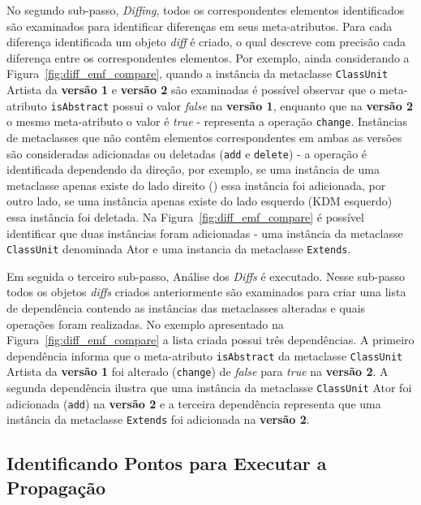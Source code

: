 No segundo sub-passo, \textit{Diffing}, todos os correspondentes elementos identificados são examinados para identificar diferenças em seus meta-atributos. Para cada diferença identificada um objeto \textit{diff} é criado, o qual descreve com precisão cada diferença entre os correspondentes elementos. Por exemplo, ainda considerando a Figura~\ref{fig:diff_emf_compare}, quando a instância da metaclasse \texttt{ClassUnit} Artista da \textbf{versão 1} e \textbf{versão 2} são examinadas é possível observar que o meta-atributo \texttt{isAbstract} possui o valor \textit{false} na \textbf{versão 1}, enquanto que na \textbf{versão 2} o mesmo meta-atributo o valor é \textit{true} - representa a operação \texttt{change}. Instâncias de metaclasses que não contêm elementos correspondentes em ambas as versões são consideradas adicionadas ou deletadas (\texttt{add} e \texttt{delete}) - a operação é identificada dependendo da direção, por exemplo, se uma instância de uma metaclasse apenas existe do lado direito () essa instância foi adicionada, por outro lado, se uma instância apenas existe do lado esquerdo (KDM esquerdo) essa instância foi deletada. Na Figura~\ref{fig:diff_emf_compare} é possível identificar que duas instâncias foram adicionadas - uma instância da metaclasse \texttt{ClassUnit} denominada Ator e uma instancia da metaclasse \texttt{Extends}.

Em seguida o terceiro sub-passo, Análise dos \textit{Diffs} é executado. Nesse sub-passo todos os objetos \textit{diffs} criados anteriormente são examinados para criar uma lista de dependência contendo as instâncias das metaclasses alteradas e quais operações foram realizadas. No exemplo apresentado na Figura~\ref{fig:diff_emf_compare} a lista criada possui três dependências. A primeiro dependência informa que o meta-atributo \texttt{isAbstract} da metaclasse \texttt{ClassUnit} Artista da \textbf{versão 1} foi alterado (\texttt{change}) de \textit{false} para \textit{true} na \textbf{versão 2}. A segunda dependência ilustra que uma instância da metaclasse \texttt{ClassUnit} Ator foi adicionada (\texttt{add}) na \textbf{versão 2} e a terceira dependência representa que uma instância da metaclasse \texttt{Extends} foi adicionada na \textbf{versão 2}.


\subsection{Identificando Pontos para Executar a Propagação}


